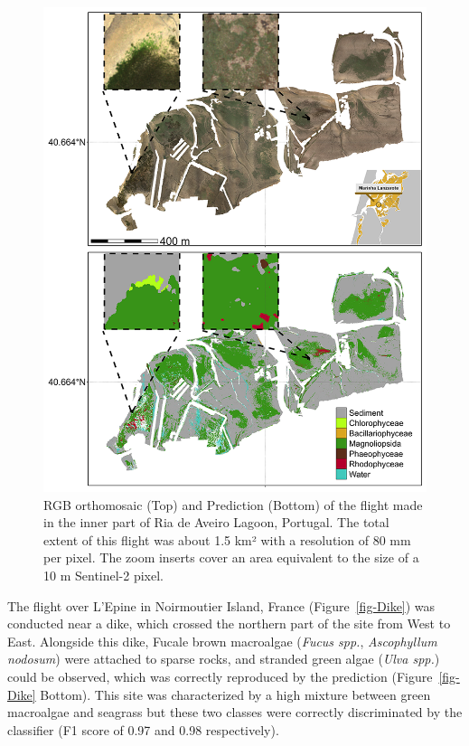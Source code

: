 \documentclass[
  letterpaper,
  11pt,
  english,
  singlespacing,
  headsepline]{MastersDoctoralThesis}
\begin{document}
\begin{spacing}{1.5}
\begin{figure}
{\includegraphics[width=0.95\linewidth,height=\textheight,keepaspectratio]{Chapter3/Figs/Figure7.png}

}

\caption{\label{fig-Boat}RGB orthomosaic (Top) and Prediction (Bottom)
of the flight made in the inner part of Ria de Aveiro Lagoon, Portugal.
The total extent of this flight was about 1.5 km² with a resolution of
80 mm per pixel. The zoom inserts cover an area equivalent to the size
of a 10 m Sentinel-2 pixel.}

\end{figure}%

The flight over L'Epine in Noirmoutier Island, France
(Figure~\ref{fig-Dike}) was conducted near a dike, which crossed the
northern part of the site from West to East. Alongside this dike, Fucale
brown macroalgae (\emph{Fucus spp.}, \emph{Ascophyllum nodosum}) were
attached to sparse rocks, and stranded green algae (\emph{Ulva spp.})
could be observed, which was correctly reproduced by the prediction
(Figure~\ref{fig-Dike} Bottom). This site was characterized by a high
mixture between green macroalgae and seagrass but these two classes were
correctly discriminated by the classifier (F1 score of 0.97 and 0.98
respectively).


\end{spacing}
\end{document}
